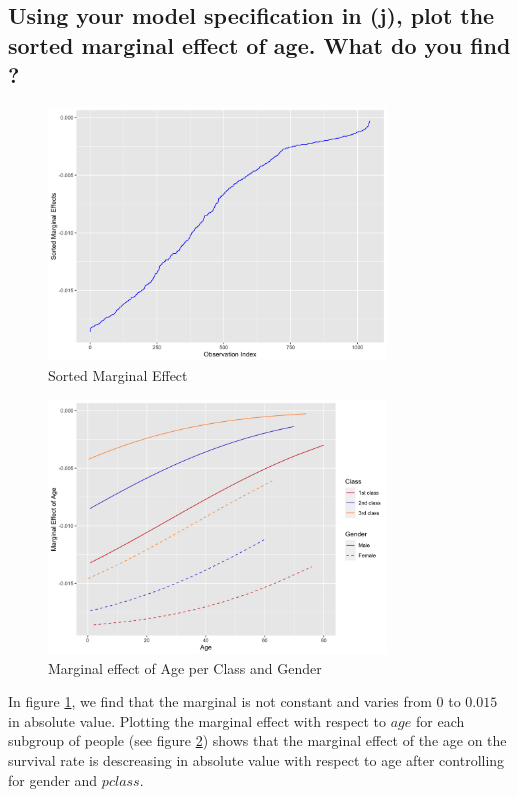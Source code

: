 \documentclass[12pt]{article}
\begin{document}
\subsection{Using your model specification in (j), plot the sorted marginal effect of age. What do you find ?}
\begin{figure}[ht]
    \centering
    \includegraphics[width=0.8\textwidth]{OUTPUT/sorted_marginal_effects.png}
    \caption{Sorted Marginal Effect}
    \label{fig:sorted_marginal_effect}
  \end{figure}

  \begin{figure}[ht]
    \centering
    \includegraphics[width=0.8\textwidth]{OUTPUT/marginal_effect_age.png}
    \caption{Marginal effect of Age per Class and Gender}
    \label{fig:marginal_effect_age}
  \end{figure}
In figure \ref{fig:sorted_marginal_effect}, we find that the marginal is not constant and varies from $0$ to $0.015$ in absolute value. Plotting the marginal effect with respect to $age$ for each subgroup of people (see figure \ref{fig:marginal_effect_age}) shows that the marginal effect of the age on the survival rate is descreasing in absolute value with respect to age after controlling for gender and $pclass$.
\end{document}
